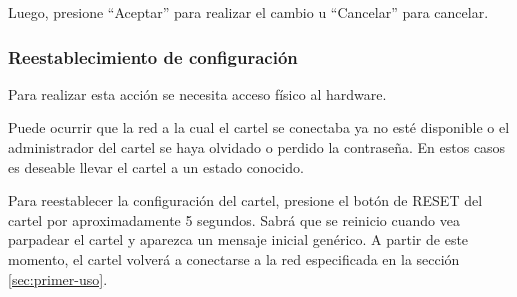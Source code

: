 Luego, presione \enquote{Aceptar} para realizar el cambio u \enquote{Cancelar} para cancelar.

\subsubsection{Reestablecimiento de configuración}\label{sec:guia-reset}
Para realizar esta acción se necesita acceso físico al hardware.

Puede ocurrir que la red a la cual el cartel se conectaba ya no esté disponible o el administrador del cartel se haya olvidado o perdido la contraseña. En estos casos es deseable llevar el cartel a un estado conocido.

Para reestablecer la configuración del cartel, presione el botón de RESET del cartel por aproximadamente 5 segundos. Sabrá que se reinicio cuando vea parpadear el cartel y aparezca un mensaje inicial genérico. A partir de este momento, el cartel volverá a conectarse a la red especificada en la sección \ref{sec:primer-uso}.
